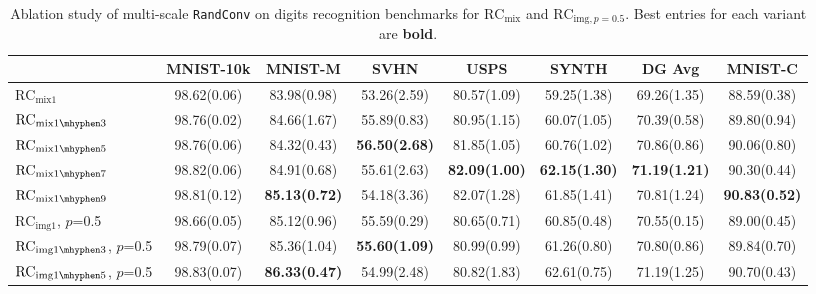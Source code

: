 \documentclass{article} \usepackage{iclr2021_conference,times}
\newcommand{\RandConv}{\texttt{RandConv}}
\begin{document}
\begin{table}[htp]
	\small
	\centering
	\setlength{\tabcolsep}{3pt}
	\caption{Ablation study of multi-scale {\RandConv} on digits recognition benchmarks for $\text{RC}_{\text{mix}}$ and $\text{RC}_{\text{img}, p=0.5}$. Best entries for each variant are \textbf{bold}.}
	\label{digits-scale}
	\begin{tabular}{l|c|ccccc|c}
		\toprule
		& MNIST-10k    & MNIST-M    & SVHN        & USPS        & SYNTH       & DG Avg         & MNIST-C     \\
		\midrule
		$\text{RC}_{\text{mix}{1}}$       & 98.62\tiny(0.06)          & 83.98\tiny(0.98)          & 53.26\tiny(2.59)          & 80.57\tiny(1.09)          & 59.25\tiny(1.38)          & 69.26\tiny(1.35)          & 88.59\tiny(0.38)          \\
		$\text{RC}_{\text{mix}{1\mhyphen3}}$  & 98.76\tiny(0.02)          & 84.66\tiny(1.67)          & 55.89\tiny(0.83)          & 80.95\tiny(1.15)          & 60.07\tiny(1.05)          & 70.39\tiny(0.58)          & 89.80\tiny(0.94)          \\
		$\text{RC}_{\text{mix}{1\mhyphen5}}$  & 98.76\tiny(0.06)          & 84.32\tiny(0.43)          & \textbf{56.50\tiny(2.68)} & 81.85\tiny(1.05)    & 60.76\tiny(1.02)          & 70.86\tiny(0.86)          & 90.06\tiny(0.80)          \\
		$\text{RC}_{\text{mix}{1\mhyphen7}}$  & 98.82\tiny(0.06)    	& 84.91\tiny(0.68)         & 55.61\tiny(2.63)   & \textbf{82.09\tiny(1.00)} & \textbf{62.15\tiny(1.30)}   & \textbf{71.19\tiny(1.21)}        & 90.30\tiny(0.44)   \\
		$\text{RC}_{\text{mix}{1\mhyphen9}}$ &  98.81\tiny(0.12) & \textbf{85.13\tiny(0.72)}          & 54.18\tiny(3.36)          & 82.07\tiny(1.28)          & 61.85\tiny(1.41)          & 70.81\tiny(1.24)          & \textbf{90.83\tiny(0.52)}   \\
		\midrule
		$\text{RC}_{\text{img}{1}}$\tiny, $p$=0.5   & 98.66\tiny(0.05) & 85.12\tiny(0.96)          & 55.59\tiny(0.29)          & 80.65\tiny(0.71)          & 60.85\tiny(0.48)          & 70.55\tiny(0.15)          & 89.00\tiny(0.45)          \\
		$\text{RC}_{\text{img}{1\mhyphen3}}$\tiny, $p$=0.5 & 98.79\tiny(0.07) & 85.36\tiny(1.04)          & \textbf{55.60\tiny(1.09)} & 80.99\tiny(0.99)          & 61.26\tiny(0.80)          & 70.80\tiny(0.86)          & 89.84\tiny(0.70)          \\
		$\text{RC}_{\text{img}{1\mhyphen5}}$\tiny, $p$=0.5 & 98.83\tiny(0.07) & \textbf{86.33\tiny(0.47)} & 54.99\tiny(2.48)          & 80.82\tiny(1.83)          & 62.61\tiny(0.75)          & 71.19\tiny(1.25)          & 90.70\tiny(0.43)          \\

\end{tabular}
\end{table}
\end{document}
